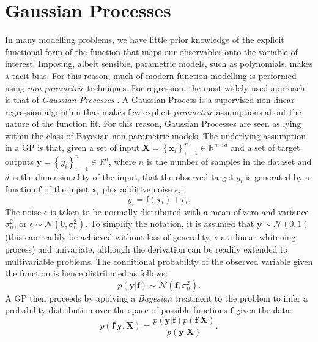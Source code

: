 \documentclass[useAMS,usenatbib,fleqn]{mn2e}
\begin{document}
\section{Gaussian Processes}
\label{sec-gaussian-process}
In many modelling problems, we have little prior knowledge of the explicit functional form of the function that maps our observables onto the variable of interest. Imposing, albeit sensible, parametric models, such as polynomials, makes a tacit bias. For this reason, much of modern function modelling is performed using \emph{non-parametric} techniques. For regression, the most widely used approach is that of \emph{Gaussian Processes} \citep{rasmussen2006gaussian}.
A Gaussian Process is a supervised non-linear regression algorithm that makes few explicit \emph{parametric} assumptions about the nature of the function fit. For this reason, Gaussian Processes are seen as lying within the class of Bayesian non-parametric models. The underlying assumption in a GP is that, given a set of input $\mathbf{X}=\left\{\mathbf{x}_{i}\right\}_{i=1}^{n}\in \mathbb{R}^{n\times d}$ and a set of target outputs $\mathbf{y}=\left\{y_{i}\right\}_{i=1}^{n}\in \mathbb{R}^{n}$, where $n$ is the number of samples in the dataset and $d$ is the dimensionality of the input, that the observed target $y_{i}$ is generated by a function $\mathbf{f}$ of the input $\mathbf{x}_{i}$ plus additive noise $\epsilon_{i}$:
\begin{equation}
y_{i} = \mathbf{f}\left(\mathbf{x}_{i}\right)+\epsilon_{i}.
\end{equation}
The noise $\epsilon$ is taken to be normally distributed with a mean of zero and variance $\sigma_{n}^{2}$, or $\epsilon\sim\mathcal{N} \left(0,\sigma_{n}^{2}\right)$. To simplify the notation, it is assumed that $\mathbf{y}\sim\mathcal{N} \left(0,1\right)$ (this can readily be achieved without loss of generality, via a linear whitening process) and univariate, although the derivation can be readily extended to multivariable problems. The conditional probability of the observed variable given the function is hence distributed as follows:
\begin{equation}
p\left(\mathbf{y}|\mathbf{f}\right)\sim\mathcal{N} \left(\mathbf{f},\sigma_{n}^{2}\right).
\end{equation}
A GP then proceeds by applying a \emph{Bayesian} treatment to the problem to infer a probability distribution over the space of possible functions $\mathbf{f}$ given the data:
\begin{equation}
p\left(\mathbf{f}|\mathbf{y},\mathbf{X}\right) = \frac{p\left(\mathbf{y}|\mathbf{f}\right)p\left(\mathbf{f}|\mathbf{X}\right)}{p\left(\mathbf{y}|\mathbf{X}\right)}.
\end{equation}
\end{document}
